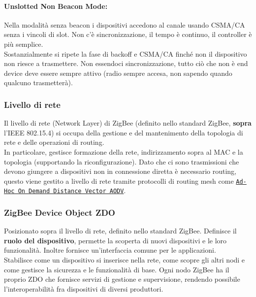 \paragraph{Unslotted Non Beacon Mode:} Nella modalità senza beacon i dispositivi accedono al canale usando CSMA/CA senza i vincoli di slot. Non c'è sincronizzazione, il tempo è continuo, il controller è più semplice.\\

Sostanzialmente si ripete la fase di backoff e CSMA/CA finché non il dispositivo non riesce a trasmettere. Non essendoci sincronizzazione, tutto ciò che non è end device deve essere sempre attivo (radio sempre accesa, non sapendo quando qualcuno trasmetterà).\\

\newpage

\subsubsection{Livello di rete}
Il livello di rete (Network Layer) di ZigBee (definito nello standard ZigBee, \textbf{sopra} l'IEEE 802.15.4) si occupa della gestione e del mantenimento della topologia di rete e delle operazioni di routing. \\

In particolare, gestisce formazione della rete, indirizzamento sopra al MAC e la topologia (supportando la riconfigurazione). Dato che ci sono trasmissioni che devono giungere a dispositivi non in connessione diretta è necessario routing, questo viene gestito a livello di rete tramite protocolli di routing mesh come \href{https://en.wikipedia.org/wiki/Ad_hoc_On-Demand_Distance_Vector_Routing}{\texttt{Ad-Hoc On Demand Distance Vector AODV}}.\\

\subsubsection{ZigBee Device Object ZDO}
Posizionato sopra il livello di rete, definito nello standard ZigBee. Definisce il \textbf{ruolo del dispositivo}, permette la scoperta di nuovi dispositivi e le loro funzionalità. Inoltre fornisce un'interfaccia comune per le applicazioni.\\

Stabilisce come un dispositivo si inserisce nella rete, come scopre gli altri nodi e come gestisce la sicurezza e le funzionalità di base. Ogni nodo ZigBee ha il proprio ZDO che fornisce servizi di gestione e supervisione, rendendo possibile l’interoperabilità fra dispositivi di diversi produttori. \\

